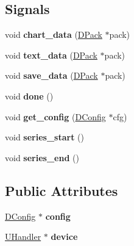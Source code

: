 \subsection*{Signals}
\begin{DoxyCompactItemize}
\item 
\hypertarget{class_d_thread_a052faa4435bc9057a87c161b6bb570cf}{
void {\bfseries chart\_\-data} (\hyperlink{struct_d_pack}{DPack} $\ast$pack)}
\label{class_d_thread_a052faa4435bc9057a87c161b6bb570cf}

\item 
\hypertarget{class_d_thread_ace8013c8fbabb60e1ccb12eb630ec2fc}{
void {\bfseries text\_\-data} (\hyperlink{struct_d_pack}{DPack} $\ast$pack)}
\label{class_d_thread_ace8013c8fbabb60e1ccb12eb630ec2fc}

\item 
\hypertarget{class_d_thread_a5913dcefd646c4394c4421272059fd1e}{
void {\bfseries save\_\-data} (\hyperlink{struct_d_pack}{DPack} $\ast$pack)}
\label{class_d_thread_a5913dcefd646c4394c4421272059fd1e}

\item 
\hypertarget{class_d_thread_aad09f78cbf9b44a48697c405006527e3}{
void {\bfseries done} ()}
\label{class_d_thread_aad09f78cbf9b44a48697c405006527e3}

\item 
\hypertarget{class_d_thread_adfb0b72452e635f540c6a07ae0dad25c}{
void {\bfseries get\_\-config} (\hyperlink{class_d_config}{DConfig} $\ast$cfg)}
\label{class_d_thread_adfb0b72452e635f540c6a07ae0dad25c}

\item 
\hypertarget{class_d_thread_a35d637542b7766ea38f61768b824d1fd}{
void {\bfseries series\_\-start} ()}
\label{class_d_thread_a35d637542b7766ea38f61768b824d1fd}

\item 
\hypertarget{class_d_thread_aa70fd320d0eb6ef3b0da3b3338a9e07f}{
void {\bfseries series\_\-end} ()}
\label{class_d_thread_aa70fd320d0eb6ef3b0da3b3338a9e07f}

\end{DoxyCompactItemize}
\subsection*{Public Attributes}
\begin{DoxyCompactItemize}
\item 
\hypertarget{class_d_thread_af8950244842797b03785958c2ec66d1a}{
\hyperlink{class_d_config}{DConfig} $\ast$ {\bfseries config}}
\label{class_d_thread_af8950244842797b03785958c2ec66d1a}

\item 
\hypertarget{class_d_thread_ad8af957fb6500a12f65cf6847afbd205}{
\hyperlink{class_u_handler}{UHandler} $\ast$ {\bfseries device}}
\label{class_d_thread_ad8af957fb6500a12f65cf6847afbd205}

\end{DoxyCompactItemize}
